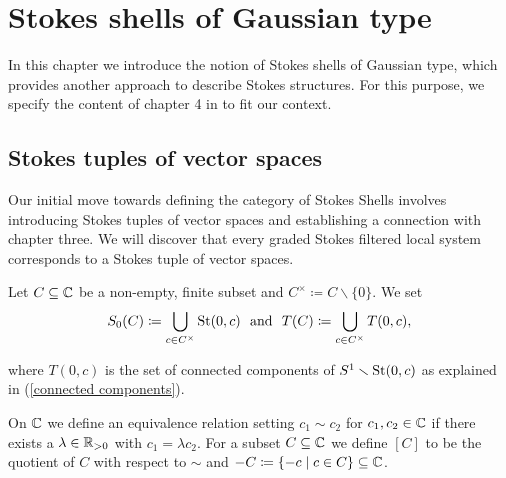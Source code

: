 \chapter{Stokes shells of Gaussian type}

In this chapter we introduce the notion of Stokes shells of Gaussian type, which provides another approach to describe Stokes structures. For this purpose, we specify the content of chapter 4 in \cite{mochistokes} to fit our context. 

\section{Stokes tuples of vector spaces}
Our initial move towards defining the category of Stokes Shells involves introducing Stokes tuples of vector spaces and establishing a connection with chapter three. We will discover that every graded Stokes filtered local system corresponds to a Stokes tuple of vector spaces.

\begin{nota}
Let $C \subseteq \mathbb{C}$ be a non-empty, finite subset and $C^\times \coloneqq C \smallsetminus \{0\}$. We set 
\[
S_0(C) \coloneqq \bigcup_{c \in C^\times}\operatorname{St}(0,c) ~ \text{ and } ~ T(C) \coloneqq \bigcup_{c \in C^\times}T(0,c),
\]

where $T(0,c)$ is the set of connected components of $S^1 \smallsetminus \operatorname{St}(0,c)$ as explained in (\ref{connected components}).

\begin{comment}
    \textcolor{red}{warum lässt man die negativen $\lambda$ weg?} \textcolor{purple}{Man hat dann zwar nicht zwangsläufig $\arg(c_1) = \arg(c_2)$ aber $\arg(c_1) \in \{\arg(c_2), \arg(c_2)+\pi\}$ und die haben die selben Stokes-Richtungen. Beachte auch, dass für $a = \lambda b$ nicht $\St(a,c)= \St(b,c)$ für allgemeines $c \in \C$ gilt.} \textcolor{blue}{Weil für die negativen $\lambda$ nicht mehr $S^1_{c<0} = S^1_{\lambda c < 0}$ sondern die umgedrehte Ungleichung $S^1_{c<0}= S_{0<\lambda c}^1$ gilt.}
\end{comment}

On $\mathbb{C}$ we define an equivalence relation setting $c_1 \sim c_2$ for $c_1,c_2 \in \mathbb{C}$ if there exists a $\lambda \in \mathbb{R}_{>0}$ with $c_1 = \lambda c_2$. For a subset $C \subseteq \mathbb{C}$ we define $[C]$ to be the quotient of $C$ with respect to $\sim$ and $-C \coloneqq \{-c \mid c \in C\} \subseteq \mathbb{C}$.
\end{nota}



